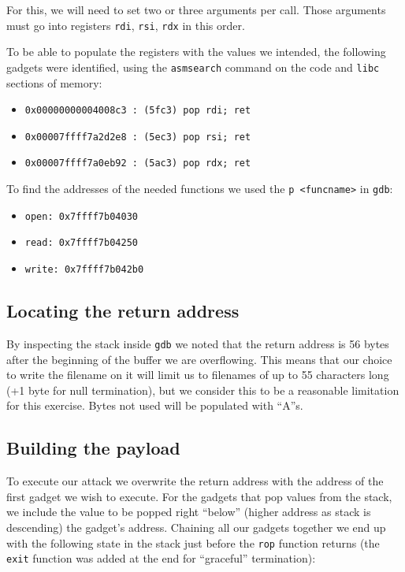 \documentclass[12pt]{article}
\begin{document}
For this, we will need to set two or three arguments per call. Those arguments must go into registers \texttt{rdi}, \texttt{rsi}, \texttt{rdx} in this order.

To be able to populate the registers with the values we intended, the following gadgets were identified, using the \texttt{asmsearch} command on the code and \texttt{libc} sections of memory:
\begin{itemize}
    \itemsep0em
    \item \texttt{0x00000000004008c3 : (5fc3)	pop    rdi;	ret}
    \item \texttt{0x00007ffff7a2d2e8 : (5ec3)	pop    rsi;	ret}
    \item \texttt{0x00007ffff7a0eb92 : (5ac3)	pop    rdx;	ret}
\end{itemize}

To find the addresses of the needed functions we used the \texttt{p <funcname>} in \texttt{gdb}:
\begin{itemize}
    \itemsep0em
    \item \texttt{open: 0x7ffff7b04030}
    \item \texttt{read: 0x7ffff7b04250}
    \item \texttt{write:  0x7ffff7b042b0}
\end{itemize}


\subsection{Locating the return address}

By inspecting the stack inside \texttt{gdb} we noted that the return address is 56 bytes after the beginning of the buffer we are overflowing. This means that our choice to write the filename on it will limit us to filenames of up to 55 characters long (+1 byte for null termination), but we consider this to be a reasonable limitation for this exercise. Bytes not used will be populated with ``A''s.


\subsection{Building the payload}

To execute our attack we overwrite the return address with the address of the first gadget we wish to execute. For the gadgets that pop values from the stack, we include the value to be popped right ``below'' (higher address as stack is descending) the gadget's address. Chaining all our gadgets together we end up with the following state in the stack just before the \texttt{rop} function returns (the \texttt{exit} function was added at the end for ``graceful'' termination): 
\end{document}
